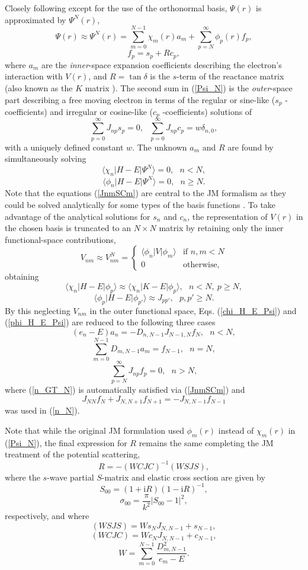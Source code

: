 \documentclass[aip,pra,showpacs,aps,twocolumn,groupedaddress,floatfix]{revtex4}
\newcommand{\beq}{\begin{equation}}
\newcommand{\eeq}{\end{equation}}
\begin{document}
Closely following \citet{BR76p1491} except for the use of the orthonormal basis, $\Psi(r)$  is approximated by $\Psi^N(r)$,
\beq
\Psi(r) \approx \Psi^N(r)=\sum_{m=0}^{N-1} \chi_m(r) a_m  + \sum_{p=N}^{\infty} \phi_p(r) f_p, \label{Psi_N}
\eeq
\beq
f_p=s_p+Rc_p, \label{f_p}
\eeq
where $a_m$ are the {\em inner}-space expansion coefficients describing  the electron's interaction with  $V(r)$, and
$R=\tan\delta$ is the $s$-term of the reactance matrix (also known as the $K$ matrix \cite{Taylor72}).
The second sum in (\ref{Psi_N}) is the {\em outer}-space part describing a free moving electron in terms of the regular or sine-like ($s_p$ -coefficients) and irregular or cosine-like ($c_p$ -coefficients) solutions of
\beq
\sum_{p=0}^{\infty} J_{np}s_p=0, \ \ \
\sum_{p=0}^{\infty} J_{np}c_p=w\delta_{n,0}, \label{JnmSCm}
\eeq
with a uniquely defined constant $w$.
The unknown $a_m$ and $R$ are found by simultaneously solving
\beq
\langle\chi_n|H-E|\Psi^N\rangle=0 , \ \ \ n<N, \label{chi_H_E_Psi}
\eeq
\beq
\langle\phi_n|H-E|\Psi^N\rangle=0 , \ \ \ n \geq N. \label{phi_H_E_Psi}
\eeq
Note that the equations (\ref{JnmSCm}) are central to the JM formalism as they could be solved analytically for some types of the basis functions \cite{YAA01p042703}. To take advantage of the analytical solutions for $s_n$  and  $c_n$, the representation of $V(r)$  in the chosen basis is truncated to an $N\times N$  matrix by retaining only the inner functional-space contributions,
\beq
V_{nm} \approx V_{nm}^N = \left\{
\begin{array}{ll}
\langle\phi_n|V|\phi_m\rangle & \mbox{if $n,m < N$} \\
0 & \mbox{otherwise,}   \end{array}  \right.
\label{V_N}
\eeq
obtaining
\beq
\langle\chi_n|H-E|\phi_p\rangle \approx \langle\chi_n|K-E|\phi_p\rangle, \ \ \ n<N, \ p\geq N,
\label{chi_H_E_phi_p}
\eeq
\beq
\langle\phi_p|H-E|\phi_{p'}\rangle \approx J_{pp'}, \ \ \ p,p'\geq N.
\label{phi_H_E_phi_p}
\eeq
 By this neglecting $V_{nm}$ in the outer functional space, Eqs. (\ref{chi_H_E_Psi}) and (\ref{phi_H_E_Psi}) are reduced to the following three cases
\beq
(e_n-E)a_n=-D_{n,N-1}J_{N-1,N}f_N, \ \ \ n<N,
\label{n_N_1}
\eeq
\beq
\sum_{m=0}^{N-1}  D_{m,N-1}a_m=f_{N-1}, \ \ \ n=N,
\label{n_N}
\eeq
\beq
\sum_{p=N}^{\infty}  J_{np}f_p=0, \ \ \ n>N,
\label{n_GT_N}
\eeq
where (\ref{n_GT_N}) is automatically satisfied via (\ref{JnmSCm}) and
\beq
J_{NN}f_N+J_{N,N+1}f_{N+1}=-J_{N,N-1}f_{N-1}
\eeq
was used in (\ref{n_N}).

Note that while the original JM formulation used $\phi_m(r)$ instead of $\chi_m(r)$ in (\ref{Psi_N}), the final expression for $R$ remains the same completing the JM treatment of the potential scattering,
\beq
R= - (WCJC)^{-1} (WSJS),
\label{R}
\eeq
where the $s$-wave partial $S$-matrix and elastic cross section are given by
\beq
S_{00}=(1+\mbox{i}R)(1-\mbox{i}R)^{-1},
\eeq
\beq
\sigma_{00}=\frac{\pi}{k^2} |S_{00}-1|^2,
\eeq
respectively, and where
\beq
(WSJS) = W s_N J_{N,N-1} + s_{N-1},
\eeq
\beq
(WCJC) = W c_N J_{N,N-1} + c_{N-1},
\eeq
\beq
W= \sum_{m=0}^{N-1} \frac{D_{m,N-1}^2}{e_m-E}.
\label{g}
\eeq
\end{document}
